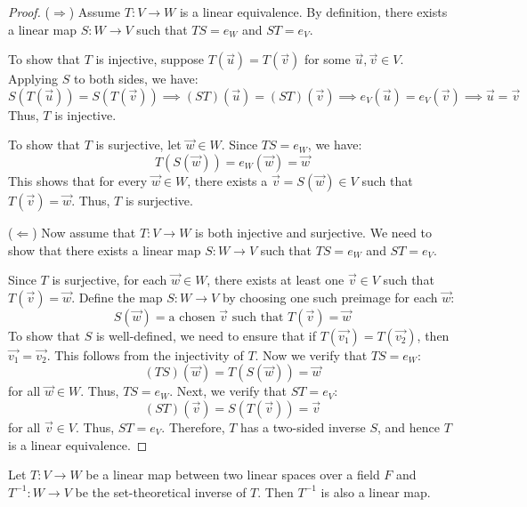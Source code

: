\documentclass[11pt,fleqn]{book} %
\begin{document}
\begin{proof}
    (\(\Rightarrow\)) Assume \(T: V \to W\) is a linear equivalence. By definition, there exists a linear map \(S: W \to V\) such that \(TS = e_W\) and \(ST = e_V\).

    To show that \(T\) is injective, suppose \(T(\vec{u}) = T(\vec{v})\) for some \(\vec{u}, \vec{v} \in V\). Applying \(S\) to both sides, we have:
    \[
        S(T(\vec{u})) = S(T(\vec{v})) \implies (ST)(\vec{u}) = (ST)(\vec{v}) \implies e_V(\vec{u}) = e_V(\vec{v}) \implies \vec{u} = \vec{v}
    \]
    Thus, \(T\) is injective.

    To show that \(T\) is surjective, let \(\vec{w} \in W\). Since \(TS = e_W\), we have:
    \[
        T(S(\vec{w})) = e_W(\vec{w}) = \vec{w}
    \]
    This shows that for every \(\vec{w} \in W\), there exists a \(\vec{v} = S(\vec{w}) \in V\) such that \(T(\vec{v}) = \vec{w}\). Thus, \(T\) is surjective.

    (\(\Leftarrow\)) Now assume that \(T: V \to W\) is both injective and surjective. We need to show that there exists a linear map \(S: W \to V\) such that \(TS = e_W\) and \(ST = e_V\).

    Since \(T\) is surjective, for each \(\vec{w} \in W\), there exists at least one \(\vec{v} \in V\) such that \(T(\vec{v}) = \vec{w}\). Define the map \(S: W \to V\) by choosing one such preimage for each \(\vec{w}\):
    \[
        S(\vec{w}) = \text{a chosen } \vec{v} \text{ such that } T(\vec{v}) = \vec{w}
    \]
    To show that \(S\) is well-defined, we need to ensure that if \(T(\vec{v_1}) = T(\vec{v_2})\), then \(\vec{v_1} = \vec{v_2}\). This follows from the injectivity of \(T\).
    Now we verify that \(TS = e_W\):
    \[
        (TS)(\vec{w}) = T(S(\vec{w})) = \vec{w}
    \]
    for all \(\vec{w} \in W\). Thus, \(TS = e_W\).
    Next, we verify that \(ST = e_V\):
    \[
        (ST)(\vec{v}) = S(T(\vec{v})) = \vec{v}
    \]
    for all \(\vec{v} \in V\). Thus, \(ST = e_V\).
    Therefore, \(T\) has a two-sided inverse \(S\), and hence \(T\) is a linear equivalence.
\end{proof}

\begin{proposition}
    Let $T: V \to W$ be a linear map between two linear spaces over a field $F$ and $T^{-1}: W \to V$ be the set-theoretical inverse of $T$. Then $T^{-1}$ is also a linear map.
\end{proposition}
\end{document}
